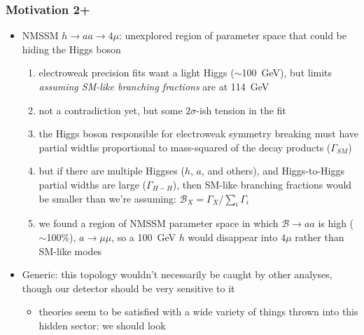 \documentclass[compress]{beamer}
\begin{document}
\begin{frame}
\frametitle{Motivation 2+}
\begin{itemize}
\item NMSSM $h \to aa \to 4\mu$: unexplored region of parameter space that could be hiding the Higgs boson
\begin{enumerate}
\item electroweak precision fits want a light Higgs ($\sim$100~GeV),
  but limits {\it assuming SM-like branching fractions} are at 114~GeV
\item not a contradiction yet, but some $2\sigma$-ish tension in the fit
\item the Higgs boson responsible for electroweak symmetry breaking
  must have partial widths proportional to mass-squared of the decay
  products ($\Gamma_{SM}$)
\item but if there are multiple Higgses ($h$, $a$, and others), and
  Higgs-to-Higgs partial widths are large ($\Gamma_{H-H}$), then
  SM-like branching fractions would be smaller than we're assuming:
  $\mathcal{B}_X = \Gamma_X / \sum_i \Gamma_i$
\item we found a region of NMSSM parameter space in which $\mathcal{B}
  \to aa$ is high ($\sim$100\%), $a \to \mu\mu$, so a 100~GeV $h$
  would disappear into $4\mu$ rather than SM-like modes
\end{enumerate}

\item Generic: this topology wouldn't necessarily be caught by other
  analyses, though our detector should be very sensitive to it
\begin{itemize}
\item theories seem to be satisfied with a wide variety of things
  thrown into this hidden sector: we should look
\end{itemize}
\end{itemize}
\end{frame}
\end{document}
